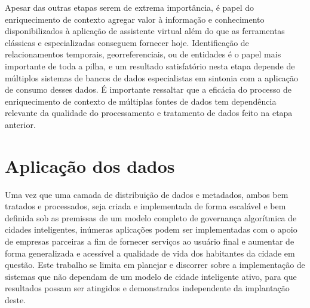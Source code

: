 Apesar das outras etapas serem de extrema importância, é papel do enriquecimento de contexto agregar valor à informação e conhecimento disponibilizados à aplicação de assistente virtual além do que as ferramentas clássicas e especializadas conseguem fornecer hoje. Identificação de relacionamentos temporais, georreferenciais, ou de entidades é o papel mais importante de toda a pilha, e um resultado satisfatório nesta etapa depende de múltiplos sistemas de bancos de dados especialistas em sintonia com a aplicação de consumo desses dados. É importante ressaltar que a eficácia do processo de enriquecimento de contexto de múltiplas fontes de dados tem dependência relevante da qualidade do processamento e tratamento de dados feito na etapa anterior.

\section{Aplicação dos dados}

Uma vez que uma camada de distribuição de dados e metadados, ambos bem tratados e processados, seja criada e implementada de forma escalável e bem definida sob as premissas de um modelo completo de governança algorítmica de cidades inteligentes, inúmeras aplicações podem ser implementadas com o apoio de empresas parceiras a fim de fornecer serviços ao usuário final e aumentar de forma generalizada e acessível a qualidade de vida dos habitantes da cidade em questão. Este trabalho se limita em planejar e discorrer sobre a implementação de sistemas que não dependam de um modelo de cidade inteligente ativo, para que resultados possam ser atingidos e demonstrados independente da implantação deste.